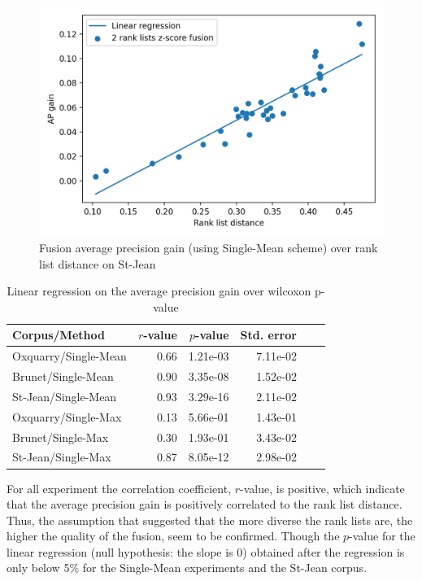 \begin{figure}
  \caption{Fusion average precision gain (using Single-Mean scheme) over rank list distance on St-Jean}
  \label{fig:rl_correlations}
  \includegraphics[width=\linewidth]{img/rank_list_correlation_mean_st_jean.png}
\end{figure}

\begin{table}
  \caption{Linear regression on the average precision gain over wilcoxon p-value}
  \label{tab:rl_correlations_regression}
  \begin{tabular}{l r r r r r}
    \toprule
    Corpus/Method      & $r$-value & $p$-value & Std. error \\
    \midrule
    Oxquarry/Single-Mean & 0.66 & 1.21e-03 & 7.11e-02 \\
    Brunet/Single-Mean   & 0.90 & 3.35e-08 & 1.52e-02 \\
    St-Jean/Single-Mean  & 0.93 & 3.29e-16 & 2.11e-02 \\
    \midrule
    Oxquarry/Single-Max  & 0.13 & 5.66e-01 & 1.43e-01 \\
    Brunet/Single-Max    & 0.30 & 1.93e-01 & 3.43e-02 \\
    St-Jean/Single-Max   & 0.87 & 8.05e-12 & 2.98e-02 \\
    \bottomrule
  \end{tabular}
\end{table}

For all experiment the correlation coefficient, $r$-value, is positive, which indicate that the average precision gain is positively correlated to the rank list distance.
Thus, the assumption that suggested that the more diverse the rank lists are, the higher the quality of the fusion, seem to be confirmed.
Though the $p$-value for the linear regression (null hypothesis: the slope is 0) obtained after the regression is only below 5\% for the Single-Mean experiments and the St-Jean corpus.
\clearpage
